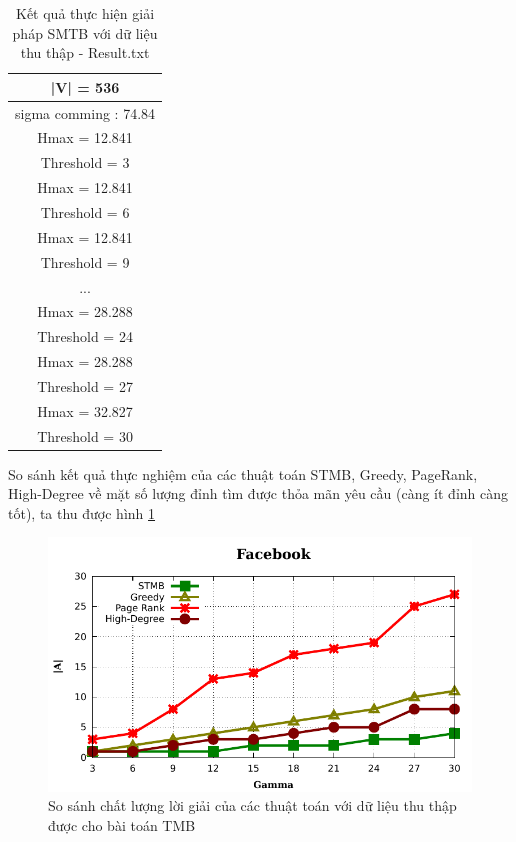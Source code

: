 \begin{itemize}
	\begin{table} [!htp]
		\centering
		\begin{tabular}{|c|}
			\hline
			|V| = 536\\
			\hline
			sigma comming : 74.84\\
			\hline
			Hmax = 12.841\\
			\hline
			Threshold = 3\\
			\hline
			Hmax = 12.841\\
			\hline
			Threshold = 6\\
			\hline
			Hmax = 12.841\\
			\hline
			Threshold = 9\\
			\hline
			...\\
			\hline
			Hmax = 28.288\\
			\hline
			Threshold = 24\\
			\hline
			Hmax = 28.288\\
			\hline
			Threshold = 27\\
			\hline
			Hmax = 32.827\\
			\hline
			Threshold = 30\\
			\hline 
		\end{tabular}
		\caption{Kết quả thực hiện giải pháp SMTB với dữ liệu thu thập - Result.txt}
		\label{bang4_7} 
	\end{table}
So sánh kết quả thực nghiệm của các thuật toán STMB, Greedy, PageRank, High-Degree về mặt số lượng đỉnh tìm được thỏa mãn yêu cầu (càng ít đỉnh càng tốt), ta thu được hình \ref{realData_TMB}
	\begin{center}
		\begin{figure}[H]
			\begin{center}
				\includegraphics [scale=1]{picture/Facebook}
			\end{center}
			\caption{So sánh chất lượng lời giải của các thuật toán với dữ liệu thu thập được cho bài toán TMB}
			\label{realData_TMB}
		\end{figure}
	\end{center}


\end{itemize}
